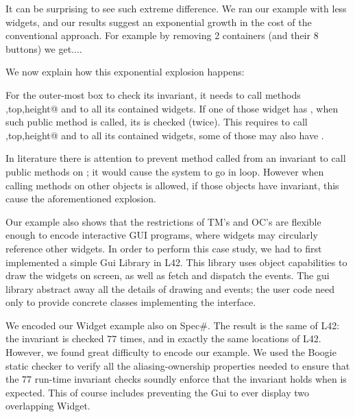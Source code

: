 It can be surprising to see such extreme difference.
We ran our example with less widgets, and our results suggest an exponential growth in the cost of the conventional approach. For example by removing 2 containers (and their 8 buttons) we get....

We now explain how this exponential explosion happens:

For the outer-most box to check its invariant, it needs to call methods \Q@left,top,height@ and \Q@with@ to all its contained widgets.
If one of those widget has \Q@invariant@, when such public method is called,
its \Q@invariant@ is checked (twice). This requires to call \Q@left,top,height@ and \Q@with@ to all its contained widgets, some of those may also have \Q@invariant@s.

In literature there is attention to prevent method called from an invariant to call public methods on \Q@this@; it would cause the system to go in loop.
However when calling methods on other objects is allowed, if those objects have invariant, this cause the aforementioned explosion. 

Our example also shows that the restrictions of TM's and OC's are flexible enough to encode interactive GUI programs, where widgets may circularly reference other widgets.
In order to perform this case study, we had to first implemented a simple Gui Library in L42. This library uses object capabilities to draw the widgets on screen, as well as fetch and dispatch the events.
The gui library abstract away all the details of drawing and events; the user code need only to provide concrete classes implementing the \Q@Widget@ interface.

We encoded our Widget example also on Spec\#.
The result is the same of L42: the invariant is checked $77$ times, and in exactly the same locations of L42.
However, we found great difficulty to encode our example.
We used the Boogie static checker to verify all the aliasing-ownership properties needed to
ensure that the $77$ run-time invariant checks soundly enforce that the invariant holds when is expected.
This of course includes preventing the Gui to ever display two overlapping Widget. 

